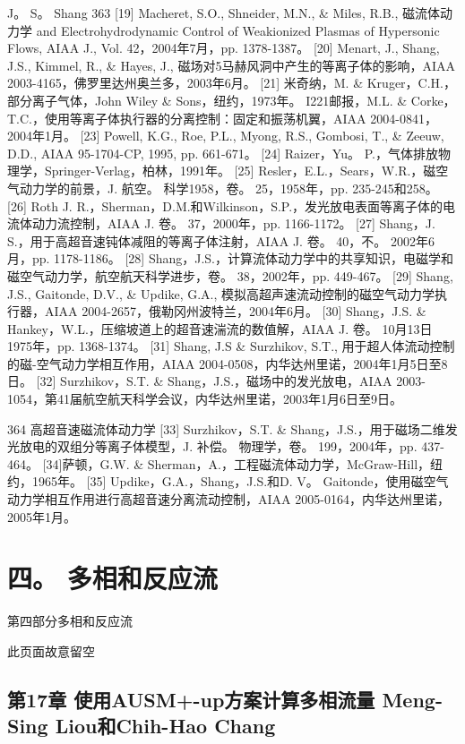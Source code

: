 \documentclass[UTF8,11pt,a4paper,openany,fontset=fandol]{ctexbook}
\begin{document}
J。 S。 Shang 363 [19] Macheret, S.O., Shneider, M.N., \& Miles, R.B., 磁流体动力学 and Electrohydrodynamic Control of Weakionized Plasmas of Hypersonic Flows, AIAA J., Vol. 42，2004年7月，pp. 1378-1387。 [20] Menart, J., Shang, J.S., Kimmel, R., \& Hayes, J., 磁场对5马赫风洞中产生的等离子体的影响，AIAA 2003-4165，佛罗里达州奥兰多，2003年6月。 [21] 米奇纳，M. \& Kruger，C.H.，部分离子气体，John Wiley \& Sons，纽约，1973年。 I221邮报，M.L. \& Corke，T.C.，使用等离子体执行器的分离控制：固定和振荡机翼，AIAA 2004-0841，2004年1月。 [23] Powell, K.G., Roe, P.L., Myong, R.S., Gombosi, T., \& Zeeuw, D.D., AIAA 95-1704-CP, 1995, pp. 661-671。 [24] Raizer，Yu。 P.，气体排放物理学，Springer-Verlag，柏林，1991年。 [25] Resler，E.L.，Sears，W.R.，磁空气动力学的前景，J. 航空。 科学1958，卷。 25，1958年，pp. 235-245和258。 [26] Roth J. R.，Sherman，D.M.和Wilkinson，S.P.，发光放电表面等离子体的电流体动力流控制，AIAA J. 卷。 37，2000年，pp. 1166-1172。 [27] Shang，J. S.，用于高超音速钝体减阻的等离子体注射，AIAA J. 卷。 40，不。 2002年6月，pp. 1178-1186。 [28] Shang，J.S.，计算流体动力学中的共享知识，电磁学和磁空气动力学，航空航天科学进步，卷。 38，2002年，pp. 449-467。 [29] Shang, J.S., Gaitonde, D.V., \& Updike, G.A., 模拟高超声速流动控制的磁空气动力学执行器，AIAA 2004-2657，俄勒冈州波特兰，2004年6月。 [30] Shang，J.S. \& Hankey，W.L.，压缩坡道上的超音速湍流的数值解，AIAA J. 卷。 10月13日 1975年，pp. 1368-1374。 [31] Shang, J.S \& Surzhikov, S.T., 用于超人体流动控制的磁-空气动力学相互作用，AIAA 2004-0508，内华达州里诺，2004年1月5日至8日。 [32] Surzhikov，S.T. \& Shang，J.S.，磁场中的发光放电，AIAA 2003-1054，第41届航空航天科学会议，内华达州里诺，2003年1月6日至9日。

364 高超音速磁流体动力学 [33] Surzhikov，S.T. \& Shang，J.S.，用于磁场二维发光放电的双组分等离子体模型，J. 补偿。 物理学，卷。 199，2004年，pp. 437-464。 [34]萨顿，G.W. \& Sherman，A.，工程磁流体动力学，McGraw-Hill，纽约，1965年。 [35] Updike，G.A.，Shang，J.S.和D. V。 Gaitonde，使用磁空气动力学相互作用进行高超音速分离流动控制，AIAA 2005-0164，内华达州里诺，2005年1月。

\clearpage
\part{四。 多相和反应流}
第四部分多相和反应流

此页面故意留空

\clearpage
\chapter{第17章 使用AUSM+-up方案计算多相流量 Meng-Sing Liou和Chih-Hao Chang}
\end{document}
